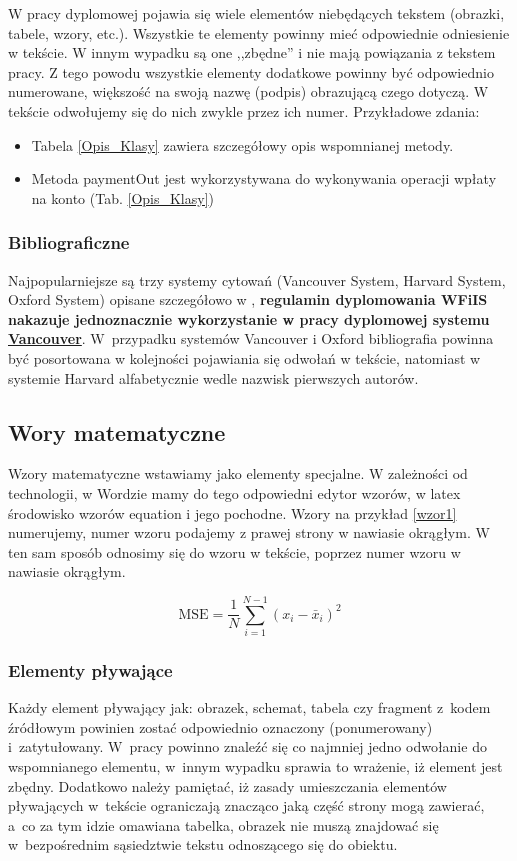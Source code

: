 \documentclass[12pt,a4paper]{article}
\begin{document}
W pracy dyplomowej pojawia się wiele elementów niebędących tekstem (obrazki, tabele, wzory, etc.). Wszystkie te elementy powinny mieć odpowiednie odniesienie w tekście. W innym wypadku są one ,,zbędne'' i nie mają powiązania z tekstem pracy. Z tego powodu wszystkie elementy dodatkowe powinny być odpowiednio numerowane, większość na swoją nazwę (podpis) obrazującą czego dotyczą. W tekście odwołujemy się do nich zwykle przez ich numer. Przykładowe zdania: 
\begin{itemize}
\item Tabela \ref{Opis_Klasy} zawiera szczegółowy opis wspomnianej metody.
\item Metoda paymentOut jest wykorzystywana do wykonywania operacji wpłaty na konto (Tab. \ref{Opis_Klasy})
\end{itemize}


\subsubsection{Bibliograficzne}
Najpopularniejsze są trzy systemy cytowań (Vancouver System, Harvard System, Oxford System) opisane szczegółowo w \cite{Cytowanie}, {\bf regulamin dyplomowania WFiIS nakazuje jednoznacznie  wykorzystanie w pracy dyplomowej systemu \underline{Vancouver}}. W~przypadku systemów Vancouver i Oxford bibliografia powinna być posortowana w kolejności pojawiania się odwołań w tekście, natomiast w systemie Harvard alfabetycznie wedle nazwisk pierwszych autorów.

\subsection{Wory matematyczne}
Wzory matematyczne wstawiamy jako elementy specjalne. W zależności od technologii, w Wordzie mamy do tego odpowiedni edytor wzorów, w latex środowisko wzorów equation i jego pochodne. Wzory na przykład \eqref{wzor1} numerujemy, numer wzoru podajemy z prawej strony w nawiasie okrągłym. W ten sam sposób odnosimy się do wzoru w tekście, poprzez numer wzoru w nawiasie okrągłym.

\begin{equation}
\label{wzor1}
\text{MSE} = \frac{1}{N}\sum_{i=1}^{N-1} (x_i - \bar{x}_i)^2  
\end{equation}


\subsubsection{Elementy pływające}
Każdy element pływający jak: obrazek, schemat, tabela czy fragment z~kodem źródłowym powinien zostać odpowiednio oznaczony (ponumerowany) i~zatytułowany. W~pracy powinno znaleźć się co najmniej jedno odwołanie do wspomnianego elementu, w~innym wypadku sprawia to wrażenie, iż element jest zbędny. Dodatkowo należy pamiętać, iż zasady umieszczania elementów pływających w~tekście ograniczają znacząco jaką część strony mogą zawierać, a~co za tym idzie omawiana tabelka, obrazek nie muszą znajdować się w~bezpośrednim sąsiedztwie tekstu odnoszącego się do obiektu.
\end{document}
